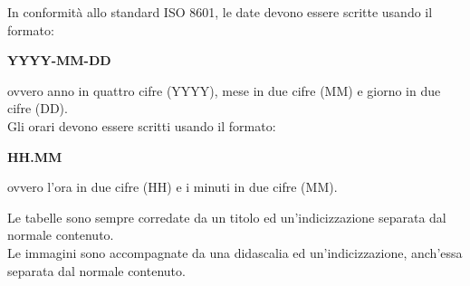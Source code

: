         In conformità allo standard ISO 8601, le date devono essere scritte usando il formato:
        \begin{center}
          \textbf{YYYY-MM-DD}
        \end{center}
        ovvero anno in quattro cifre (YYYY), mese in due cifre (MM) e giorno in due cifre (DD).\\
        Gli orari devono essere scritti usando il formato:
        \begin{center}
          \textbf{HH.MM}
        \end{center}
        ovvero l'ora in due cifre (HH) e i minuti in due cifre (MM).

        Le tabelle sono sempre corredate da un titolo ed un'indicizzazione separata dal normale contenuto.\\
        Le immagini sono accompagnate da una didascalia ed un'indicizzazione, anch'essa separata dal normale contenuto.

